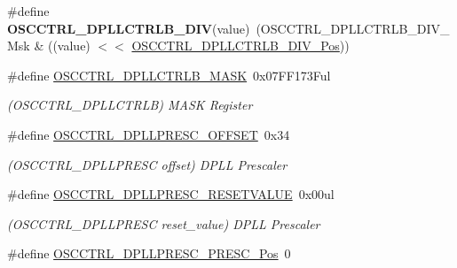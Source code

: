 \begin{DoxyCompactItemize}
\item 
\hypertarget{group___s_a_m_l21___o_s_c_c_t_r_l_gaa815c0a93debf885f8e0153bf9a88a4e}{}\#define {\bfseries O\+S\+C\+C\+T\+R\+L\+\_\+\+D\+P\+L\+L\+C\+T\+R\+L\+B\+\_\+\+D\+I\+V}(value)~(O\+S\+C\+C\+T\+R\+L\+\_\+\+D\+P\+L\+L\+C\+T\+R\+L\+B\+\_\+\+D\+I\+V\+\_\+\+Msk \& ((value) $<$$<$ \hyperlink{group___s_a_m_l21___o_s_c_c_t_r_l_ga4be649bdf3f99bbda9c530dbfadd27ef}{O\+S\+C\+C\+T\+R\+L\+\_\+\+D\+P\+L\+L\+C\+T\+R\+L\+B\+\_\+\+D\+I\+V\+\_\+\+Pos}))\label{group___s_a_m_l21___o_s_c_c_t_r_l_gaa815c0a93debf885f8e0153bf9a88a4e}

\item 
\hypertarget{group___s_a_m_l21___o_s_c_c_t_r_l_ga05fc8d7b773b1d682b972d9f4101001d}{}\#define \hyperlink{group___s_a_m_l21___o_s_c_c_t_r_l_ga05fc8d7b773b1d682b972d9f4101001d}{O\+S\+C\+C\+T\+R\+L\+\_\+\+D\+P\+L\+L\+C\+T\+R\+L\+B\+\_\+\+M\+A\+S\+K}~0x07\+F\+F173\+Ful\label{group___s_a_m_l21___o_s_c_c_t_r_l_ga05fc8d7b773b1d682b972d9f4101001d}

\begin{DoxyCompactList}\small\item\em (O\+S\+C\+C\+T\+R\+L\+\_\+\+D\+P\+L\+L\+C\+T\+R\+L\+B) M\+A\+S\+K Register \end{DoxyCompactList}\item 
\hypertarget{group___s_a_m_l21___o_s_c_c_t_r_l_gad307cac1e4f6346efdff25fcfaa03cb8}{}\#define \hyperlink{group___s_a_m_l21___o_s_c_c_t_r_l_gad307cac1e4f6346efdff25fcfaa03cb8}{O\+S\+C\+C\+T\+R\+L\+\_\+\+D\+P\+L\+L\+P\+R\+E\+S\+C\+\_\+\+O\+F\+F\+S\+E\+T}~0x34\label{group___s_a_m_l21___o_s_c_c_t_r_l_gad307cac1e4f6346efdff25fcfaa03cb8}

\begin{DoxyCompactList}\small\item\em (O\+S\+C\+C\+T\+R\+L\+\_\+\+D\+P\+L\+L\+P\+R\+E\+S\+C offset) D\+P\+L\+L Prescaler \end{DoxyCompactList}\item 
\hypertarget{group___s_a_m_l21___o_s_c_c_t_r_l_ga9106450896e7e2b8001bacca9266b684}{}\#define \hyperlink{group___s_a_m_l21___o_s_c_c_t_r_l_ga9106450896e7e2b8001bacca9266b684}{O\+S\+C\+C\+T\+R\+L\+\_\+\+D\+P\+L\+L\+P\+R\+E\+S\+C\+\_\+\+R\+E\+S\+E\+T\+V\+A\+L\+U\+E}~0x00ul\label{group___s_a_m_l21___o_s_c_c_t_r_l_ga9106450896e7e2b8001bacca9266b684}

\begin{DoxyCompactList}\small\item\em (O\+S\+C\+C\+T\+R\+L\+\_\+\+D\+P\+L\+L\+P\+R\+E\+S\+C reset\+\_\+value) D\+P\+L\+L Prescaler \end{DoxyCompactList}\item 
\hypertarget{group___s_a_m_l21___o_s_c_c_t_r_l_ga54c15cc2481ad7fcd40eb19d9011319a}{}\#define \hyperlink{group___s_a_m_l21___o_s_c_c_t_r_l_ga54c15cc2481ad7fcd40eb19d9011319a}{O\+S\+C\+C\+T\+R\+L\+\_\+\+D\+P\+L\+L\+P\+R\+E\+S\+C\+\_\+\+P\+R\+E\+S\+C\+\_\+\+Pos}~0\label{group___s_a_m_l21___o_s_c_c_t_r_l_ga54c15cc2481ad7fcd40eb19d9011319a}


\end{DoxyCompactItemize}
